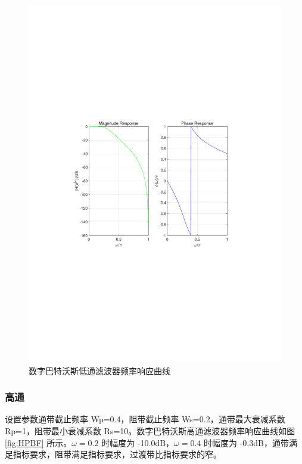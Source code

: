 \documentclass[12pt,AutoFakeBold]{article}
\begin{document}
\begin{figure}[hbtp]
	\centering
	\includegraphics[width=14cm]{figure/LPBF.pdf}
	\caption{数字巴特沃斯低通滤波器频率响应曲线} \label{fig:LPBF}
\end{figure}


\subsubsection{高通}

设置参数通带截止频率 Wp=0.4，阻带截止频率 Ws=0.2，通带最大衰减系数 Rp=1，阻带最小衰减系数 Rs=10。数字巴特沃斯高通滤波器频率响应曲线如图 \ref{fig:HPBF} 所示。$\omega=0.2$ 时幅度为 -10.0dB，$\omega=0.4$ 时幅度为 -0.3dB，通带满足指标要求，阻带满足指标要求，过渡带比指标要求的窄。
\end{document}
